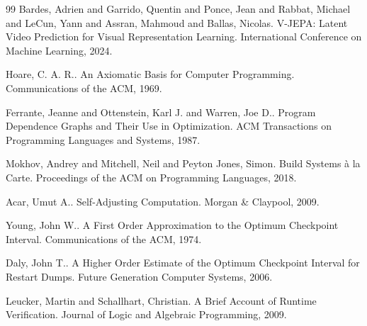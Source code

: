 \documentclass[11pt,a4paper]{article}
\begin{document}
\begin{thebibliography}{99}
Bardes, Adrien and Garrido, Quentin and Ponce, Jean and Rabbat, Michael and LeCun, Yann and Assran, Mahmoud and Ballas, Nicolas.
\newblock V-JEPA: Latent Video Prediction for Visual Representation Learning.
\newblock International Conference on Machine Learning, 2024.

Hoare, C. A. R..
\newblock An Axiomatic Basis for Computer Programming.
\newblock Communications of the ACM, 1969.

Ferrante, Jeanne and Ottenstein, Karl J. and Warren, Joe D..
\newblock Program Dependence Graphs and Their Use in Optimization.
\newblock ACM Transactions on Programming Languages and Systems, 1987.

Mokhov, Andrey and Mitchell, Neil and Peyton Jones, Simon.
\newblock Build Systems {\`a} la Carte.
\newblock Proceedings of the ACM on Programming Languages, 2018.

Acar, Umut A..
\newblock Self-Adjusting Computation.
\newblock Morgan \& Claypool, 2009.

Young, John W..
\newblock A First Order Approximation to the Optimum Checkpoint Interval.
\newblock Communications of the ACM, 1974.

Daly, John T..
\newblock A Higher Order Estimate of the Optimum Checkpoint Interval for Restart Dumps.
\newblock Future Generation Computer Systems, 2006.

Leucker, Martin and Schallhart, Christian.
\newblock A Brief Account of Runtime Verification.
\newblock Journal of Logic and Algebraic Programming, 2009.

\end{thebibliography}
\end{document}
